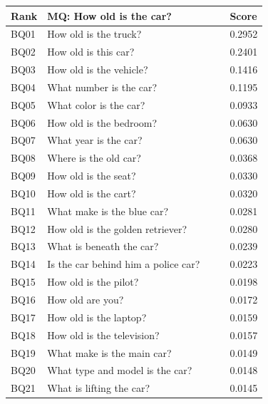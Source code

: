 \documentclass[letterpaper]{article}
\begin{document}
\begin{table}
	\begin{subtable}{0.49\linewidth}
		\begin{adjustbox}{width=0.46\columnwidth}
\begin{tabular}{l|l|l}
			Rank & MQ: How old is the car?                 & Score  \\
			\hline
			BQ01 & How old is the truck?                   & 0.2952 \\
			BQ02 & How old is this car?                    & 0.2401 \\
			BQ03 & How old is the vehicle?                 & 0.1416 \\
			BQ04 & What number is the car?                 & 0.1195 \\
			BQ05 & What color is the car?                  & 0.0933 \\
			BQ06 & How old is the bedroom?                 & 0.0630 \\
			BQ07 & What year is the car?                   & 0.0630 \\
			BQ08 & Where is the old car?                   & 0.0368 \\
			BQ09 & How old is the seat?                    & 0.0330 \\
			BQ10 & How old is the cart?                    & 0.0320 \\
			BQ11 & What make is the blue car?              & 0.0281 \\
			BQ12 & How old is the golden retriever?        & 0.0280 \\
			BQ13 & What is beneath the car?                & 0.0239 \\
			BQ14 & Is the car behind him a police car?~~~~ & 0.0223 \\
			BQ15 & How old is the pilot?                   & 0.0198 \\
			BQ16 & How old are you?                        & 0.0172 \\
			BQ17 & How old is the laptop?                  & 0.0159 \\
			BQ18 & How old is the television?              & 0.0157 \\
			BQ19 & What make is the main car?              & 0.0149 \\
			BQ20 & What type and model is the car?         & 0.0148 \\
			BQ21 & What is lifting the car?                & 0.0145 \\
		\end{tabular}
\end{adjustbox}

\end{subtable}
\end{table}
\end{document}
